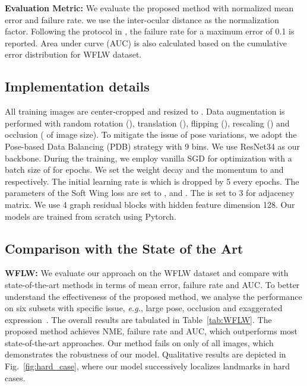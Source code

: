 \documentclass[runningheads]{llncs}
\begin{document}
\textbf{Evaluation Metric:}
We evaluate the proposed method with normalized mean error and failure rate. we use the inter-ocular distance as the normalization factor.
Following the protocol in \cite{lab}, the failure rate for a maximum error of 0.1 is reported.
Area under curve (AUC) is also calculated based on the cumulative error distribution for WFLW dataset.


\subsection{Implementation details}
All training images are center-cropped and resized to .
Data augmentation is performed with random rotation (), translation (), flipping (), rescaling () and occlusion ( of image size). 
To mitigate the issue of pose variations, we adopt the Pose-based Data Balancing (PDB)\cite{wing} strategy with 9 bins.
We use ResNet34\cite{ResNet} as our backbone.
During the training, we employ vanilla SGD for optimization with a batch size of  for  epochs.
We set the weight decay and the momentum to  and  respectively.
The initial learning rate is  which is dropped by 5 every  epochs.
The parameters of the Soft Wing loss are set to ,  and .
The  is set to 3 for adjacency matrix.
We use 4 graph residual blocks with hidden feature dimension 128.
Our models are trained from scratch using Pytorch.


\subsection{Comparison with the State of the Art}

\textbf{WFLW:}
We evaluate our approach on the WFLW dataset and compare with state-of-the-art methods in terms of mean error, failure rate and AUC.
To better understand the effectiveness of the proposed method, we analyse the performance on six subsets with specific issue, \textit{e.g.}, large pose, occlusion and exaggerated expression~\cite{lab}.
The overall results are tabulated in Table~\ref{tab:WFLW}.
The proposed method achieves  NME,  failure rate and  AUC, which outperforms most state-of-the-art approaches.
Our method fails on only  of all images, which demonstrates the robustness of our model.
Qualitative results are depicted in Fig.~\ref{fig:hard_case}, where our model successively localizes landmarks in hard cases.
\end{document}
